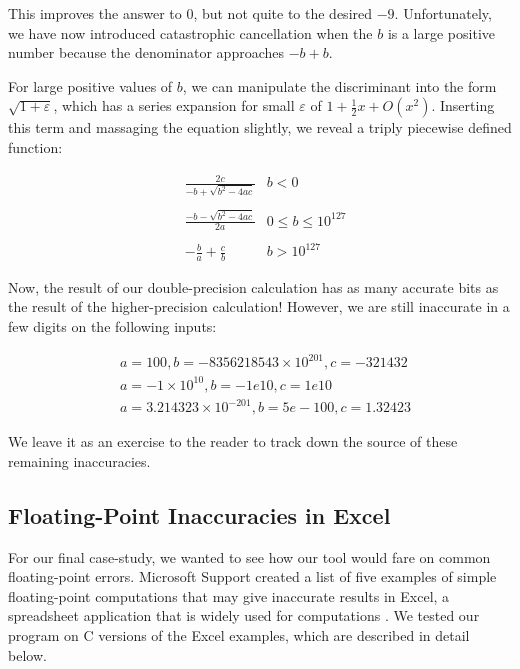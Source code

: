This improves the answer to $0$, but not quite to the desired $-9$. Unfortunately, we have now introduced catastrophic cancellation when the $b$ is a large positive number because the denominator approaches $-b + b$.

For large positive values of $b$, we can manipulate the discriminant into the form $\sqrt{1 + \varepsilon}$, which has a series expansion for small $\varepsilon$ of $1 + \frac{1}{2}x + O(x^2)$. Inserting this term and massaging the equation slightly, we reveal a triply piecewise defined function:

\begin{align*}
&\frac{2c}{-b + \sqrt{b^2 - 4ac}} & b < 0 \\\\
&\frac{-b - \sqrt{b^2 - 4ac}}{2a} & 0 \leq b \leq 10^{127} \\\\
&-\frac{b}{a} + \frac{c}{b} & b > 10^{127}
\end{align*}

Now, the result of our double-precision calculation has as many accurate bits as the result of the higher-precision calculation! However, we are still inaccurate in a few digits on the following inputs:

\begin{align*}
&a = 100                       , b = -8356218543 \times 10^{201} , c = -321432 \\
&a = -1 \times 10^{10}         , b = -1e10                       , c = 1e10 \\
&a = 3.214323 \times 10^{-201} , b = 5e-100                      , c = 1.32423
\end{align*}

We leave it as an exercise to the reader to track down the source of these remaining inaccuracies.

\subsection{Floating-Point Inaccuracies in Excel}

For our final case-study, we wanted to see how our tool would fare on common floating-point errors. Microsoft Support created a list of five examples of simple floating-point computations that may give inaccurate results in Excel, a spreadsheet application that is widely used for computations \cite{excel}. We tested our program on C versions of the Excel examples, which are described in detail below.


